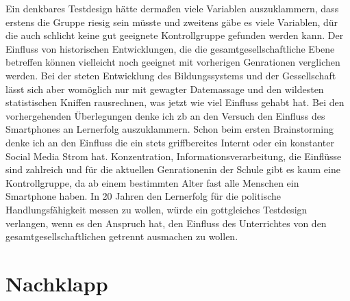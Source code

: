 Ein denkbares Testdesign hätte dermaßen viele Variablen auszuklammern, dass erstens die Gruppe riesig sein müsste und zweitens gäbe es viele Variablen, dür die auch schlicht keine gut geeignete Kontrollgruppe gefunden werden kann. Der Einfluss von historischen Entwicklungen, die die gesamtgesellschaftliche Ebene betreffen können vielleicht noch geeignet mit vorherigen Genrationen verglichen werden. Bei der steten Entwicklung des Bildungssystems und der Gessellschaft lässt sich aber womöglich nur mit gewagter Datemassage und den wildesten statistischen Kniffen rausrechnen, was jetzt wie viel Einfluss gehabt hat. 
Bei den vorhergehenden Überlegungen denke ich \gls{zb} an den Versuch den Einfluss des Smartphones an Lernerfolg auszuklammern. Schon beim ersten Brainstorming denke ich an den Einfluss die ein stets griffbereites Internt oder ein konstanter Social Media Strom hat. Konzentration, Informationsverarbeitung, die Einflüsse sind zahlreich und für die aktuellen Genrationenin der Schule gibt es kaum eine Kontrollgruppe, da ab einem bestimmten Alter fast alle Menschen ein Smartphone haben. In 20 Jahren den Lernerfolg für die politische Handlungsfähigkeit messen zu wollen, würde ein gottgleiches Testdesign verlangen, wenn es den Anspruch hat, den Einfluss des Unterrichtes von den gesamtgesellschaftlichen getrennt ausmachen zu wollen. 



\clearpage
\newpage
\printbibliography[]

\appendix %

\section{Nachklapp}
